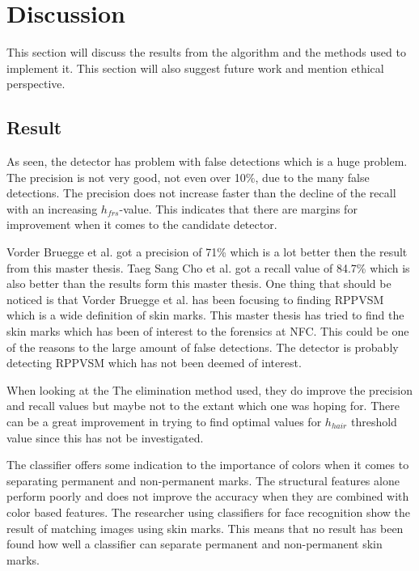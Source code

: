 \chapter{Discussion}\label{cha:Discussion}

This section will discuss the results from the algorithm and the methods used to implement it. This section will also suggest future work and mention ethical perspective.  

\section{Result}

As seen, the detector has problem with false detections which is a huge problem. The precision is not very good, not even over 10\%, due to the many false detections. The precision does not increase faster than the decline of the recall with an increasing $h_{frs}$-value. This indicates that there are margins for improvement when it comes to the candidate detector.

Vorder Bruegge et al. \cite{automatic_detector_2015} got a precision of 71\% which is a lot better then the result from this master thesis. Taeg Sang Cho et al.\cite{reliable_mole} got a recall value of 84.7\% which is also better than the results form this master thesis. One thing that should be noticed is that Vorder Bruegge et al. has been focusing to finding RPPVSM which is a wide definition of skin marks. This master thesis has tried to find the skin marks which has been of interest to the forensics at NFC. This could be one of the reasons to the large amount of false detections. The detector is probably detecting RPPVSM which has not been deemed of interest.     

When looking at the The elimination method used, they do improve the precision and recall values but maybe not to the extant which one was hoping for. There can be a great improvement in trying to find optimal values for $h_{hair}$ threshold value since this has not be investigated. 

The classifier offers some indication to the importance of colors when it comes to separating permanent and non-permanent marks. The structural features alone perform poorly and does not improve the accuracy when they are combined with color based features. The researcher using classifiers for face recognition show the result of matching images using skin marks. This means that no result has been found how well a classifier can separate permanent and non-permanent skin marks.

